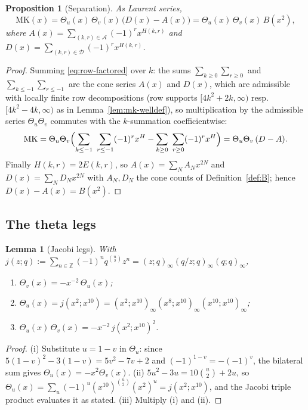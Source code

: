 \documentclass[12pt]{amsart}
\newtheorem{proposition}[theorem]{Proposition}
\newtheorem{lemma}[theorem]{Lemma}
\theoremstyle{definition}
\theoremstyle{remark}
\newcommand{\ZZ}{\mathbb{Z}}
\newcommand{\Acone}{\mathcal{A}}
\newcommand{\Dcone}{\mathcal{D}}
\newcommand{\MK}{\mathrm{MK}}
\begin{document}
\begin{proposition}[Separation]\label{prop:separation}
As Laurent series,
\[
  \MK(x)=\Theta_u(x)\,\Theta_v(x)\,\bigl(D(x)-A(x)\bigr)
        =\Theta_u(x)\,\Theta_v(x)\,B(x^2),
\]
where $A(x)=\sum_{(k,r)\in\Acone}(-1)^r x^{H(k,r)}$ and
$D(x)=\sum_{(k,r)\in\Dcone}(-1)^r x^{H(k,r)}$.
\end{proposition}

\begin{proof}
Summing \eqref{eq:row-factored} over $k$: the sums
$\sum_{k\ge0}\sum_{r\ge0}$ and $\sum_{k\le-1}\sum_{r\le-1}$ are the
cone series $A(x)$ and $D(x)$, which are admissible with locally
finite row decompositions (row supports $[4k^2+2k,\infty)$ resp.\
$[4k^2-4k,\infty)$ as in Lemma~\ref{lem:mk-welldef}), so
multiplication by the admissible series $\Theta_u\Theta_v$ commutes
with the $k$-summation coefficientwise:
\[
  \MK=\Theta_u\Theta_v\Bigl(\sum_{k\le-1}\ \sum_{r\le-1}(-1)^r x^{H}
      -\sum_{k\ge0}\ \sum_{r\ge0}(-1)^r x^{H}\Bigr)
     =\Theta_u\Theta_v\,(D-A).
\]
Finally $H(k,r)=2E(k,r)$, so $A(x)=\sum_N A_N x^{2N}$ and
$D(x)=\sum_N D_N x^{2N}$ with $A_N,D_N$ the cone counts of
Definition~\ref{def:B}; hence $D(x)-A(x)=B(x^2)$.
\end{proof}

\subsection{The theta legs}

\begin{lemma}[Jacobi legs]\label{lem:jtp}
With $j(z;q):=\sum_{n\in\ZZ}(-1)^n q^{\binom n2}z^n
=(z;q)_\infty(q/z;q)_\infty(q;q)_\infty$,
\begin{enumerate}
\item $\Theta_v(x)=-x^{-2}\,\Theta_u(x)$;
\item $\Theta_u(x)=j(x^2;x^{10})
      =(x^2;x^{10})_\infty(x^8;x^{10})_\infty(x^{10};x^{10})_\infty$;
\item $\Theta_u(x)\,\Theta_v(x)=-x^{-2}\,j(x^2;x^{10})^2$.
\end{enumerate}
\end{lemma}

\begin{proof}
(i) Substitute $u=1-v$ in $\Theta_u$: since
$5(1-v)^2-3(1-v)=5v^2-7v+2$ and $(-1)^{1-v}=-(-1)^v$, the bilateral
sum gives $\Theta_u(x)=-x^{2}\Theta_v(x)$.
(ii) $5u^2-3u=10\binom u2+2u$, so
$\Theta_u(x)=\sum_u(-1)^u (x^{10})^{\binom u2}(x^{2})^{u}
=j(x^2;x^{10})$, and the Jacobi triple product evaluates it as
stated.
(iii) Multiply (i) and (ii).
\end{proof}
\end{document}
